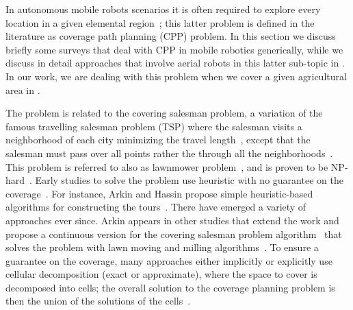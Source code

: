 In autonomous mobile robots scenarios it is often required to explore every location in a given elemental region~\citep{cao1988region}; this latter problem is defined in the literature as coverage path planning (CPP) problem.
In this section we discuss briefly some surveys that deal with CPP in mobile robotics generically, while we discuss in detail approaches that involve aerial robots in this latter sub-topic in . In our work, we are dealing with this problem when we cover a given agricultural area in . 

The problem is related to the covering salesman problem, a variation of the famous travelling salesman problem (TSP) where the salesman visits a neighborhood of each city minimizing the travel length~\citep{arkin1994approximation}, except that the salesman must pass over all points rather the through all the neighborhoods~\citep{choset2001coverage}. This problem is referred to also as lawnmower problem~\citep{galceran2013survey}, and is proven to be NP-hard~\citep{arkin2000approximation}. Early studies to solve the problem use heuristic with no guarantee on the coverage~\citep{choset2001coverage}. For instance, Arkin and Hassin propose simple heuristic-based algorithms for constructing the tours~\citep{arkin1994approximation}. There have emerged a variety of approaches ever since. Arkin appears in other studies that extend the work and propose a continuous version for the covering salesman problem algorithm~\citep{arkin1993lawnmower,fekete1994lawnmower,arkin2000approximation} that solves the problem with lawn moving and milling algorithms~\citep{arkin2000approximation}. To ensure a guarantee on the coverage, many approaches either implicitly or explicitly use cellular decomposition (exact or approximate), where the space to cover is decomposed into cells; the overall solution to the coverage planning problem is then the union of the solutions of the cells~\citep{choset2001coverage}. 

